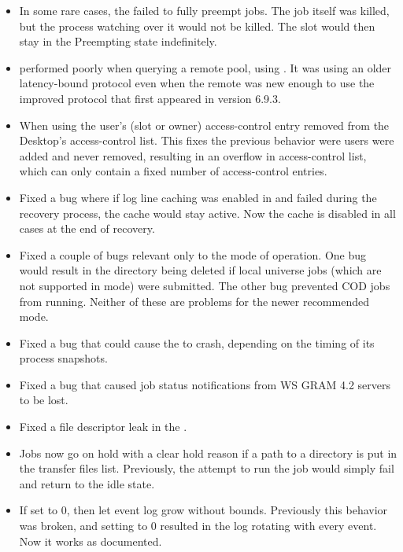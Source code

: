 \begin{itemize}

\item In some rare cases, the  failed to fully preempt jobs.
The job itself was killed, but the  process watching over
it would not be killed.  The slot would then stay in the Preempting state
indefinitely.

\item {} performed poorly when querying a remote pool, using
.  It was using an older latency-bound protocol even when
the remote  was new enough to use the improved protocol
that first appeared in version 6.9.3.

\item When using  the user's (slot or owner)
access-control entry removed from the Desktop's access-control list.  This
fixes the previous behavior were users were added and never removed, 
resulting in an overflow in access-control list, which can only contain 
a fixed number of access-control entries.

\item Fixed a bug where if log line caching was enabled in 
and  failed during the recovery process, the cache would
stay active. Now the cache is disabled in all cases at the end of recovery.

\item Fixed a couple of bugs relevant only to the 
mode of operation. One bug would result in the  directory being
deleted if local universe jobs (which are not supported in
 mode) were submitted. The other bug prevented
COD jobs from running. Neither of these are problems for the newer
recommended  mode.

\item Fixed a bug that could cause the  to crash, depending
on the timing of its process snapshots.

\item Fixed a bug that caused job status notifications from WS GRAM 4.2
servers to be lost.

\item Fixed a file descriptor leak in the .

\item Jobs now go on hold with a clear hold reason if a path to a
directory is put in the transfer files list.  Previously, the attempt
to run the job would simply fail and return to the idle state.

\item If  set to 0, then let event log grow without 
  bounds.  Previously this behavior was broken, and setting
   to 0 resulted in the log rotating with every
  event.  Now it works as documented.

\end{itemize}

